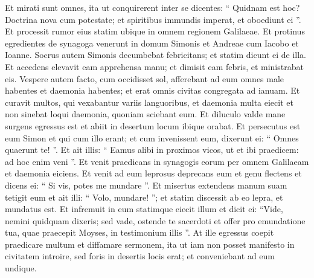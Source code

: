 \begin{biblechapter}
\verse Et mirati sunt omnes, ita ut conquirerent inter se dicentes: “ Quidnam est hoc? Doctrina nova cum potestate; et spiritibus immundis imperat, et oboediunt ei ”. 
\verse Et processit rumor eius statim ubique in omnem regionem Galilaeae.
 \verse Et protinus egredientes de synagoga venerunt in domum Simonis et Andreae cum Iacobo et Ioanne. 
\verse Socrus autem Simonis decumbebat febricitans; et statim dicunt ei de illa. 
\verse Et accedens elevavit eam apprehensa manu; et dimisit eam febris, et ministrabat eis.
 \verse Vespere autem facto, cum occidisset sol, afferebant ad eum omnes male habentes et daemonia habentes; 
\verse et erat omnis civitas congregata ad ianuam. 
\verse Et curavit multos, qui vexabantur variis languoribus, et daemonia multa eiecit et non sinebat loqui daemonia, quoniam sciebant eum.
 \verse Et diluculo valde mane surgens egressus est et abiit in desertum locum ibique orabat. 
\verse Et persecutus est eum Simon et qui cum illo erant; 
\verse et cum invenissent eum, dixerunt ei: “ Omnes quaerunt te! ”. 
\verse Et ait illis: “ Eamus alibi in proximos vicos, ut et ibi praedicem: ad hoc enim veni ”. 
\verse Et venit praedicans in synagogis eorum per omnem Galilaeam et daemonia eiciens.
 \verse Et venit ad eum leprosus deprecans eum et genu flectens et dicens ei: “ Si vis, potes me mundare ”. 
\verse Et misertus extendens manum suam tetigit eum et ait illi: “ Volo, mundare! ”; 
\verse et statim discessit ab eo lepra, et mundatus est. 
\verse Et infremuit in eum statimque eiecit illum 
\verse et dicit ei: “Vide, nemini quidquam dixeris; sed vade, ostende te sacerdoti et offer pro emundatione tua, quae praecepit Moyses, in testimonium illis ”. 
\verse At ille egressus coepit praedicare multum et diffamare sermonem, ita ut iam non posset manifesto in civitatem introire, sed foris in desertis locis erat; et conveniebant ad eum undique.
 

\end{biblechapter}
